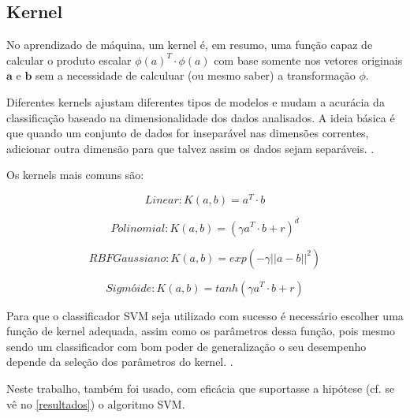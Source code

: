\subsection{Kernel}\label{kernel}
No aprendizado de máquina, um kernel é, em resumo, uma função capaz de calcular o produto escalar $\phi (a)^T \cdot \phi (a)$ com base somente nos vetores originais $\textbf{a}$ e $\textbf{b}$ sem a necessidade de calculuar (ou mesmo saber) a transformação $\phi$. 

Diferentes kernels ajustam diferentes tipos de modelos e mudam a acurácia da classificação baseado na dimensionalidade dos dados analisados. A ideia básica é que quando um conjunto de dados for inseparável nas dimensões correntes, adicionar outra dimensão para que talvez assim os dados sejam separáveis. \cite{geron_maos_2020} \cite{soman_machine_2009}.

Os kernels mais comuns são: \cite{geron_maos_2020}

\begin{equation}\label{eq:kernel-linear}
Linear: K(a,b) = a^T \cdot b
\end{equation} 

\begin{equation}\label{eq:kernel-polinomial}
Polinomial: K(a,b) = (\gamma a^T \cdot b + r)^d
\end{equation} 

\begin{equation}\label{eq:kernel-rbf}
RBF Gaussiano: K(a,b) = exp(- \gamma || a - b ||^2)
\end{equation} 

\begin{equation}\label{eq:kernel-sigmoide}
Sigmóide: K(a,b) = tanh(\gamma a^T \cdot b + r)
\end{equation} 


Para que o classificador SVM seja utilizado com sucesso é necessário escolher uma função de kernel adequada, assim como os parâmetros dessa função, pois mesmo sendo um classificador com bom poder de generalização o seu desempenho depende da seleção dos parâmetros do kernel. \cite{soman_machine_2009}. 

Neste trabalho, também foi usado, com eficácia que suportasse a hipótese (cf. se vê no \autoref{resultados}) o algoritmo SVM.

